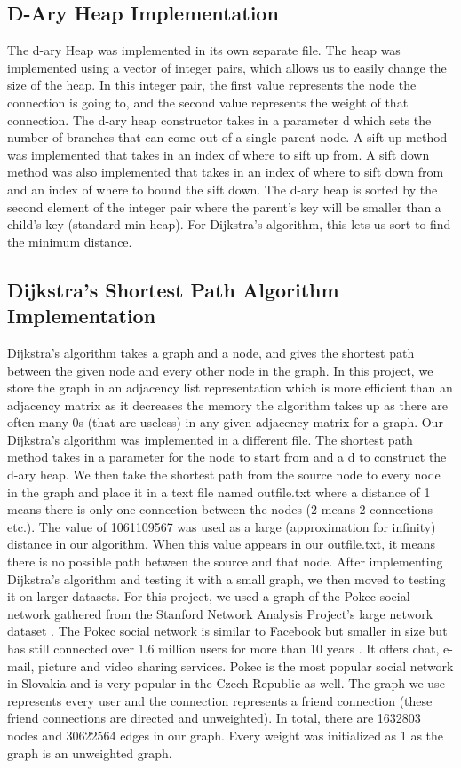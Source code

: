 \documentclass[a4paper,10pt]{article}
\begin{document}
\subsection{D-Ary Heap Implementation}
The d-ary Heap was implemented in its own separate file. The heap was implemented using a vector of integer pairs, which allows us to easily change the size of the heap. In this integer pair, the first value represents the node the connection is going to, and the second value represents the weight of that connection. The d-ary heap constructor takes in a parameter d which sets the number of branches that can come out of a single parent node. A sift up method was implemented that takes in an index of where to sift up from. A sift down method was also implemented that takes in an index of where to sift down from and an index of where to bound the sift down. The d-ary heap is sorted by the second element of the integer pair where the parent's key will be smaller than a child's key (standard min heap). For Dijkstra's algorithm, this lets us sort to find the minimum distance. 
\subsection{Dijkstra's Shortest Path Algorithm Implementation}
Dijkstra's algorithm takes a graph and a node, and gives the shortest path between the given node and every other node in the graph. In this project, we store the graph in an adjacency list representation which is more efficient than an adjacency matrix as it decreases the memory the algorithm takes up as there are often many 0s (that are useless) in any given adjacency matrix for a graph. Our Dijkstra's algorithm was implemented in a different file. The shortest path method takes in a parameter for the node to start from and a d to construct the d-ary heap. We then take the shortest path from the source node to every node in the graph and place it in a text file named outfile.txt where a distance of 1 means there is only one connection between the nodes (2 means 2 connections etc.). The value of 1061109567 was used as a large (approximation for infinity) distance in our algorithm. When this value appears in our outfile.txt, it means there is no possible path between the source and that node. \smallbreak
After implementing Dijkstra's algorithm and testing it with a small graph, we then moved to testing it on larger datasets. For this project, we used a graph of the Pokec social network gathered from the Stanford Network Analysis Project's large network dataset \cite{snap}. The Pokec social network is similar to Facebook but smaller in size but has still connected over 1.6 million users for more than 10 years \cite{takoc}. It  offers chat, e-mail,  picture  and  video  sharing  services. Pokec is  the  most popular social network in Slovakia and is very popular in the Czech Republic as well. The graph we use represents every user and the connection represents a friend connection (these friend connections are directed and unweighted). In total, there are 1632803 nodes and 30622564 edges in our graph. Every weight was initialized as 1 as the graph is an unweighted graph. 
\end{document}
